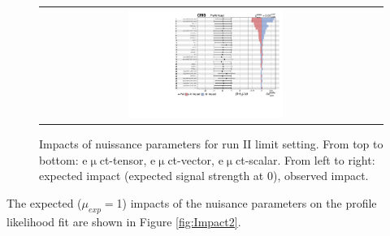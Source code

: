 \begin{figure}[tbh!]
\begin{center}
\begin{tabular}{cc}
  \includegraphics[width=0.48\textwidth]{figures/Appendix/Impact/Impact_ScalarC}\\
 \end{tabular}
 \caption{Impacts of nuissance parameters for run II limit setting. From top to bottom: e$\upmu$ct-tensor, e$\upmu$ct-vector, e$\upmu$ct-scalar. From left to right: expected impact (expected signal strength at 0), observed impact.}
 \label{fig:Impact1}
 \end{center}
\end{figure}

The expected ($\mu_{exp}=$1) impacts of the nuisance parameters on the profile likelihood fit are shown in Figure \ref{fig:Impact2}.

